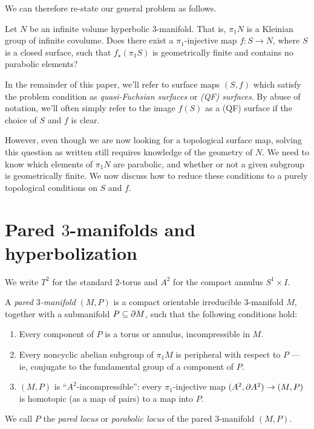 We can therefore re-state our general problem as follows.

\begin{prob}

Let $N$ be an infinite volume hyperbolic $3$-manifold. That is, $\pi_1N$ is
a Kleinian group of infinite covolume. Does there exist a $\pi_1$-injective map
$f \colon S \to N$, where $S$ is a closed surface, such that $f_\star(\pi_1S)$
is geometrically finite and contains no parabolic elements?

\end{prob}

In the remainder of this paper, we'll refer to surface maps $(S,f)$ which
satisfy the problem condition as \emph{quasi-Fuchsian surfaces} or \emph{(QF)
surfaces}. By abuse of notation, we'll often simply refer to the image $f(S)$
as a (QF) surface if the choice of $S$ and $f$ is clear.

However, even though we are now looking for a topological surface map, solving
this question as written still requires knowledge of the geometry of $N$. We
need to know which elements of $\pi_1N$ are parabolic, and whether or not
a given subgroup is geometrically finite. We now discuss how to reduce these
conditions to a purely topological conditions on $S$ and $f$.

\section{Pared \texorpdfstring{$3$}{3}-manifolds and hyperbolization}

\begin{ntn}

We write $T^2$ for the standard $2$-torus and $A^2$ for the compact annulus
$S^1 \times I$.

\end{ntn}

\begin{defn}

A \emph{pared $3$-manifold} $(M,P)$ is a compact orientable irreducible
$3$-manifold $M$, together with a submanifold $P\subseteq\partial M$, such that the
following conditions hold:

\begin{enumerate}
\item Every component of $P$ is a torus or annulus, incompressible in $M$.

\item Every noncyclic abelian subgroup of $\pi_1M$ is peripheral with respect
to $P$ --- ie, conjugate to the fundamental group of a component of $P$.

\item $(M,P)$ is ``$A^2$-incompressible'': every $\pi_1$-injective map $(A^2,
\partial A^2) \to (M,P)$ is homotopic (as a map of pairs) to a map into $P$.

\end{enumerate}

We call $P$ the \emph{pared locus} or \emph{parabolic locus} of the pared
$3$-manifold $(M,P)$.

\end{defn}

